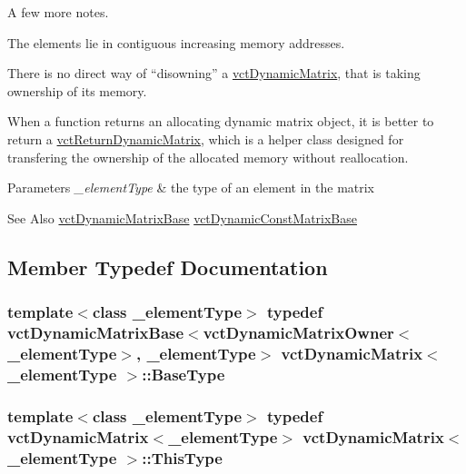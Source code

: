 A few more notes. 
\begin{DoxyItemize}
\item The elements lie in contiguous increasing memory addresses. 
\item There is no direct way of ``disowning'' a \hyperlink{classvct_dynamic_matrix}{vct\-Dynamic\-Matrix}, that is taking ownership of its memory. 
\item When a function returns an allocating dynamic matrix object, it is better to return a \hyperlink{classvct_return_dynamic_matrix}{vct\-Return\-Dynamic\-Matrix}, which is a helper class designed for transfering the ownership of the allocated memory without reallocation. 
\end{DoxyItemize}


\begin{DoxyParams}{Parameters}
{\em \-\_\-element\-Type} & the type of an element in the matrix\\
\hline
\end{DoxyParams}
\begin{DoxySeeAlso}{See Also}
\hyperlink{classvct_dynamic_matrix_base}{vct\-Dynamic\-Matrix\-Base} \hyperlink{classvct_dynamic_const_matrix_base}{vct\-Dynamic\-Const\-Matrix\-Base} 
\end{DoxySeeAlso}


\subsection{Member Typedef Documentation}
\hypertarget{classvct_dynamic_matrix_a80b366a0b1c03c7a5453e76aea1fbe83}{
\subsubsection[{Base\-Type}]{\setlength{\rightskip}{0pt plus 5cm}template$<$class \-\_\-element\-Type$>$ typedef {\bf vct\-Dynamic\-Matrix\-Base}$<${\bf vct\-Dynamic\-Matrix\-Owner}$<$\-\_\-element\-Type$>$, \-\_\-element\-Type$>$ {\bf vct\-Dynamic\-Matrix}$<$ \-\_\-element\-Type $>$\-::{\bf Base\-Type}}}\label{classvct_dynamic_matrix_a80b366a0b1c03c7a5453e76aea1fbe83}
\hypertarget{classvct_dynamic_matrix_a49440a1600af9e5cbce01b74a66434bd}{
\subsubsection[{This\-Type}]{\setlength{\rightskip}{0pt plus 5cm}template$<$class \-\_\-element\-Type$>$ typedef {\bf vct\-Dynamic\-Matrix}$<$\-\_\-element\-Type$>$ {\bf vct\-Dynamic\-Matrix}$<$ \-\_\-element\-Type $>$\-::{\bf This\-Type}}}\label{classvct_dynamic_matrix_a49440a1600af9e5cbce01b74a66434bd}


